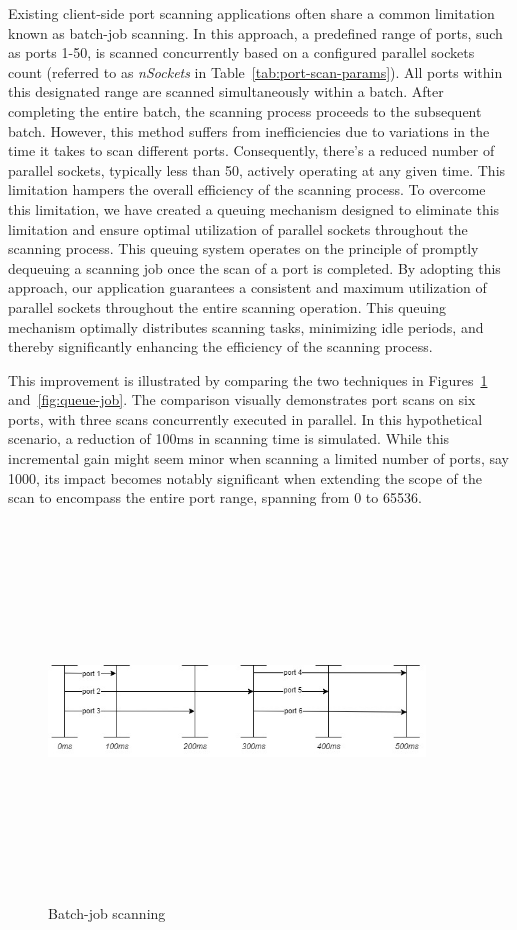 Existing client-side port scanning applications often share a common limitation known as batch-job scanning. In this approach, a predefined range of ports, such as ports 1-50, is scanned concurrently based on a configured parallel sockets count (referred to as \emph{nSockets} in Table~\ref{tab:port-scan-params}). All ports within this designated range are scanned simultaneously within a batch. After completing the entire batch, the scanning process proceeds to the subsequent batch. However, this method suffers from inefficiencies due to variations in the time it takes to scan different ports. Consequently, there's a reduced number of parallel sockets, typically less than 50, actively operating at any given time. This limitation hampers the overall efficiency of the scanning process.
To overcome this limitation, we have created a queuing mechanism designed to eliminate this limitation and ensure optimal utilization of parallel sockets throughout the scanning process. This queuing system operates on the principle of promptly dequeuing a scanning job once the scan of a port is completed. By adopting this approach, our application guarantees a consistent and maximum utilization of parallel sockets throughout the entire scanning operation. This queuing mechanism optimally distributes scanning tasks, minimizing idle periods, and thereby significantly enhancing the efficiency of the scanning process.

This improvement is illustrated by comparing the two techniques in Figures~\ref{fig:batch-job} and~\ref{fig:queue-job}. The comparison visually demonstrates port scans on six ports, with three scans concurrently executed in parallel. In this hypothetical scenario, a reduction of 100ms in scanning time is simulated. While this incremental gain might seem minor when scanning a limited number of ports, say 1000, its impact becomes notably significant when extending the scope of the scan to encompass the entire port range, spanning from 0 to 65536.

\begin{figure}[htbp]
    \centering
\includegraphics[width=10cm, height=10cm, keepaspectratio]{port_scanning_techniques/img/batch-job.jpg}
    \caption{Batch-job scanning}
    \label{fig:batch-job}
\end{figure}

